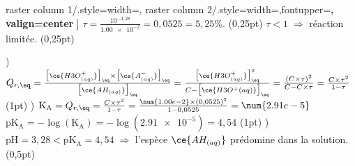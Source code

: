 \begin{tcbitemize}
\begin{tcbitemize}
               raster column 1/.style={width=\cwii},
               raster column 2/.style={width=\cwiii,fontupper=\bfseries,
                valign=center}
            ]
            \tcbitem $\tau=\frac{10^{-3,28}}{\num{1.00e-2}}=0,0525=5,25\%$.
            \tcbitem (0,25pt)
            \tcbitem $\tau<1\; \Rightarrow$ réaction limitée.
            \tcbitem (0,25pt)
        \end{tcbitemize}
    )
    \tcbitem $Q_{r,\eq}=\frac{\bigl[\ce{H3O^{+}_{(aq)}}\bigr]_{\eq}\times
              \bigl[\ce{A^{-}_{(aq)}}\bigr]_{\eq}}
              {\bigl[\ce{AH_{(aq)}}\bigr]_{\eq}}=
              \frac{\bigl[\ce{H3O^{+}_{(aq)}}\bigr]_{\eq}^{2}}
              {C-\bigl[\ce{H3O^{+}(aq)}\bigr]_{\eq}}=
              \frac{(C\times\tau)^{2}}{C-C\times\tau}=
              \frac{C\times\tau^{2}}{1-\tau}$
    \tcbitem (1pt)
    )
    \tcbitem $\mathrm{K_{A}}=Q_{r,\eq}=
              \frac{C\times\tau^{2}}{1-\tau}=
              \frac{\num{1.00e-2}\times(0,0525)^2}{1-0,0525}=
              \num{2.91e-5}$ \\
              $\mathrm{pK_{A}}=-\log(\mathrm{K_{A}})=-\log(\num{2.91e-5})=4,54$
    \tcbitem (1pt)
    )
    \tcbitem $\mathrm{pH}=3,28<\mathrm{pK_A}=4,54\; \Rightarrow $
             l'espèce $\ce{AH_{(aq)}}$ prédomine dans la solution.
    \tcbitem (0,5pt)
\end{tcbitemize}

